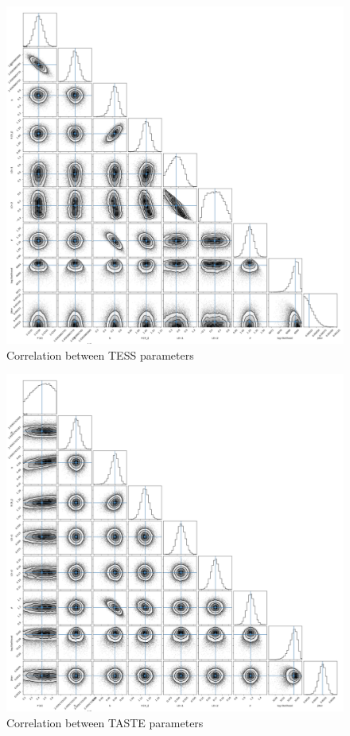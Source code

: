 \documentclass[a4paper,11pt,twocolumn]{article}
\begin{document}
\begin{figure}[H]
    \centering
      \includegraphics[scale=0.18, angle=0]{../pictures/tess/corner_tess.png}
       \caption{Correlation between TESS parameters}
\end{figure}

\begin{figure}[H]
    \centering
      \includegraphics[scale=0.18, angle=0]{../pictures/taste/corner_taste.png}
      \caption{Correlation between TASTE parameters}
\end{figure}
\end{document}
